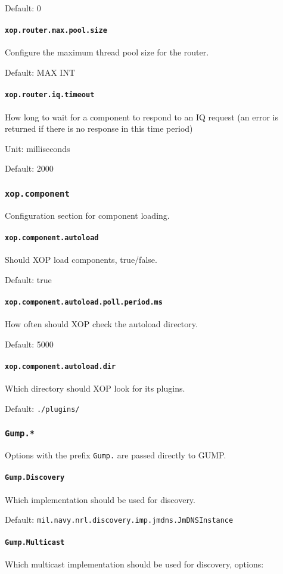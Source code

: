 \documentclass[draft]{article}
\begin{document}
Default: 0 
\paragraph{\texttt{xop.router.max.pool.size}}
Configure the maximum thread pool size for the router.

Default: MAX INT
\paragraph{\texttt{xop.router.iq.timeout}}
How long to wait for a component to respond to an IQ request (an error is returned if there is no response in this time period)

Unit: milliseconds

Default: 2000
\subsubsection{\texttt{xop.component}}
Configuration section for component loading.
\paragraph{\texttt{xop.component.autoload}}
Should XOP load components, true/false.

Default: true
\paragraph{\texttt{xop.component.autoload.poll.period.ms}}
How often should XOP check the autoload directory.

Default: 5000
\paragraph{\texttt{xop.component.autoload.dir}}
Which directory should XOP look for its plugins.

Default: \texttt{./plugins/}
\subsubsection{\texttt{Gump.*}}
Options with the prefix \texttt{Gump.} are passed directly to GUMP.
\paragraph{\texttt{Gump.Discovery}}
Which implementation should be used for discovery.

Default: \texttt{mil.navy.nrl.discovery.imp.jmdns.JmDNSInstance}
\paragraph{\texttt{Gump.Multicast}}
Which multicast implementation should be used for discovery, options:
\end{document}
